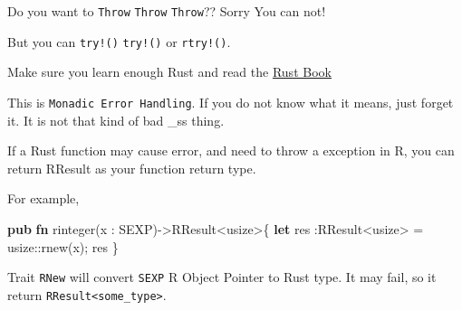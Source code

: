 \documentclass[]{book}
\newenvironment{Shaded}{\begin{snugshade}}{\end{snugshade}}
\newcommand{\KeywordTok}[1]{\textcolor[rgb]{0.13,0.29,0.53}{\textbf{{#1}}}}
\newcommand{\DataTypeTok}[1]{\textcolor[rgb]{0.13,0.29,0.53}{{#1}}}
\newcommand{\DecValTok}[1]{\textcolor[rgb]{0.00,0.00,0.81}{{#1}}}
\newcommand{\StringTok}[1]{\textcolor[rgb]{0.31,0.60,0.02}{{#1}}}
\newcommand{\CommentTok}[1]{\textcolor[rgb]{0.56,0.35,0.01}{\textit{{#1}}}}
\newcommand{\NormalTok}[1]{{#1}}
\begin{document}
Do you want to \texttt{Throw} \texttt{Throw} \texttt{Throw}?? Sorry You
can not!

But you can \texttt{try!()} \texttt{try!()} or \texttt{rtry!()}.

Make sure you learn enough Rust and read the
\href{https://doc.rust-lang.org/book/error-handling.html}{Rust Book}

This is \texttt{Monadic\ Error\ Handling}. If you do not know what it
means, just forget it. It is not that kind of bad \_ss thing.

If a Rust function may cause error, and need to throw a exception in R,
you can return RResult as your function return type.

For example,

\begin{Shaded}
\begin{Highlighting}[]
\KeywordTok{pub} \KeywordTok{fn} \NormalTok{rinteger(x : SEXP)->RResult<}\DataTypeTok{usize}\NormalTok{>\{}
    \KeywordTok{let} \NormalTok{res :RResult<}\DataTypeTok{usize}\NormalTok{> = }\DataTypeTok{usize}\NormalTok{::rnew(x);}
    \NormalTok{res}
\NormalTok{\}}
\end{Highlighting}
\end{Shaded}

Trait \texttt{RNew} will convert \texttt{SEXP} R Object Pointer to Rust
type. It may fail, so it return
\texttt{RResult\textless{}some\_type\textgreater{}}.

\begin{Shaded}
\end{Shaded}
\end{document}

